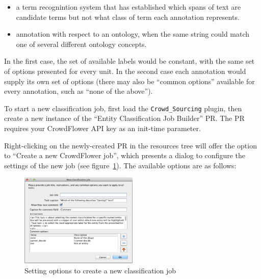 \begin{itemize}
\item a term recognintion system that has established which spans of text are
  candidate terms but not what class of term each annotation represents.
\item annotation with respect to an ontology, when the same string could match
  one of several different ontology concepts.
\end{itemize}

In the first case, the set of available labels would be constant, with the same
set of options presented for every unit.  In the second case each annotation
would supply its own set of options (there may also be ``common options''
available for every annotation, such as ``none of the above'').


To start a new classification job, first load the \verb!Crowd_Sourcing! plugin,
then create a new instance of the ``Entity Classification Job Builder'' PR.
The PR requires your CrowdFlower API key as an init-time parameter.

Right-clicking on the newly-created PR in the resources tree will offer the
option to ``Create a new CrowdFlower job'', which presents a dialog to
configure the settings of the new job (see
figure~\ref{fig:crowd:new-classification-job}).  The available options are as
follows:

\begin{figure}[tb]
  \centering
  \includegraphics[width=0.5\textwidth]{new-classification-job-dialog.png}
  \caption{Setting options to create a new classification job}
  \label{fig:crowd:new-classification-job}
\end{figure}

